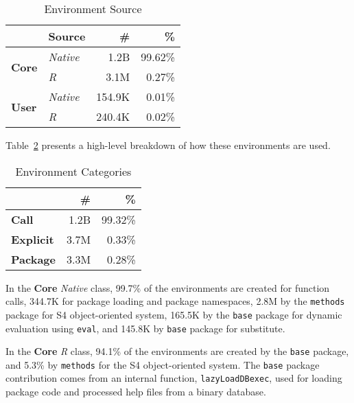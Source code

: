 \documentclass[10pt,review,sigplan,anonymous=true,authorversion=true,nonacm=true]{acmart}
\newcommand{\code}[1]{\lstinline |#1|\xspace}
\begin{document}
\begin{table}[!h]
  \small
  \centering
  \caption{Environment Source}\label{table:env_source}
  \vspace{-3mm}
  \begin{tabular}{llrr}
    \toprule
    &\textbf{Source}&\textbf{\#}&\textbf{\%}\\
    \midrule
    \multirow{2}{*}{\textbf{Core}}  & \multicolumn{1}{l}{\emph{Native}} & \multicolumn{1}{r}{1.2B} & \multicolumn{1}{r}{99.62\%}\\
                                    & \multicolumn{1}{l}{\emph{R}}      & \multicolumn{1}{r}{3.1M} & \multicolumn{1}{r}{0.27\%}\\
    \midrule
    \multirow{2}{*}{\textbf{User}}  & \multicolumn{1}{l}{\emph{Native}} & \multicolumn{1}{r}{154.9K} & \multicolumn{1}{r}{0.01\%}\\
                                    & \multicolumn{1}{l}{\emph{R}}      & \multicolumn{1}{r}{240.4K} & \multicolumn{1}{r}{0.02\%}\\
    \bottomrule
  \end{tabular}
\end{table}

Table~\ref{table:env_category} presents a high-level breakdown of how these
environments are used.

\begin{table}[!h]
  \vspace{-3mm}
  \small
  \caption{Environment Categories} \label{table:env_category}
  \centering
  \begin{tabular}{lrr}
    \toprule
    &\textbf{\#}&\textbf{\%}\\
    \midrule
    \textbf{Call}&1.2B&99.32\%\\
    \textbf{Explicit}&3.7M&0.33\%\\
    \textbf{Package}&3.3M&0.28\%\\
    \bottomrule
  \end{tabular}
\end{table}

In the \textbf{Core} \emph{Native} class, 99.7\% of the environments are created
for function calls, 344.7K for package loading and package namespaces, 2.8M by
the \code{methods} package for S4 object-oriented system, 165.5K by the
\code{base} package for dynamic evaluation using \code{eval}, and 145.8K by
\code{base} package for substitute.

In the \textbf{Core} \emph{R} class, 94.1\% of the environments are created by
the \code{base} package, and 5.3\% by \code{methods} for the S4 object-oriented
system. The \code{base} package contribution comes from an internal function,
\code{lazyLoadDBexec}, used for loading package code and processed help files
from a binary database.
\end{document}
